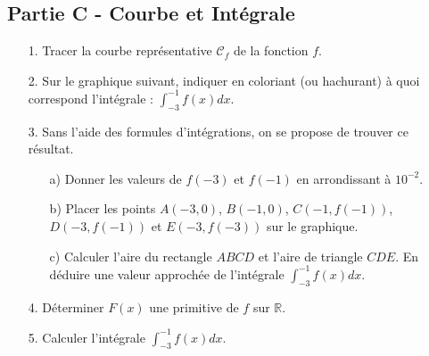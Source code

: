 \documentclass[12pt]{article}
\begin{document}
\subsection*{Partie C - Courbe et Intégrale}

\begin{enumerate}
\item[1.] Tracer la courbe représentative $\mathcal{C}_f$ de la fonction $f$.
\item[2.] Sur le graphique suivant, indiquer en coloriant (ou hachurant) à quoi correspond l'intégrale :  $\int_{-3}^{-1} f(x) dx$.
\item[3.] Sans l'aide des formules d'intégrations, on se propose de trouver ce résultat.
  \begin{enumerate}
  \item[a)] Donner les valeurs de $f(-3)$ et $f(-1)$ en arrondissant à $10^{-2}$.
  \item[b)] Placer les points $A\left(-3, 0\right)$, $B\left(-1, 0\right)$, $C\left(-1, f(-1)\right)$, $D\left(-3, f(-1)\right)$ et $E\left(-3, f(-3)\right)$ sur le graphique.
  \item[c)] Calculer l'aire du rectangle $ABCD$ et l'aire de triangle $CDE$. En déduire une valeur approchée de l'intégrale $\int_{-3}^{-1} f(x) dx$.
  \end{enumerate}   
\item[4.] Déterminer $F(x)$ une primitive de $f$ sur $\mathbb{R}$.
\item[5.] Calculer l'intégrale $\int_{-3}^{-1} f(x) dx$.
\end{enumerate}

\begin{figure}[H]
  \centering
\end{figure}
\end{document}
